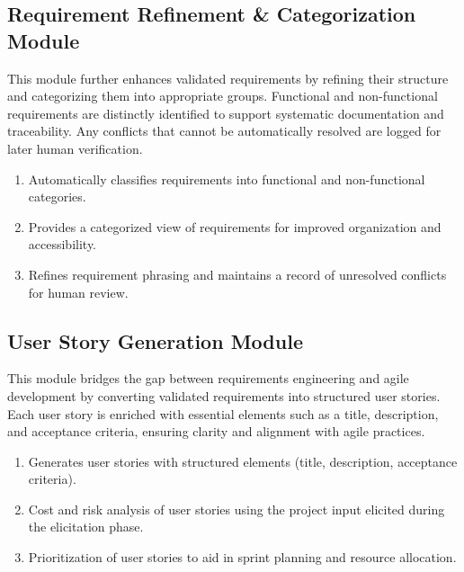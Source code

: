 \subsection{Requirement Refinement \& Categorization Module}
This module further enhances validated requirements by refining their structure and categorizing them into appropriate groups. Functional and non-functional requirements are distinctly identified to support systematic documentation and traceability. Any conflicts that cannot be automatically resolved are logged for later human verification.  
\begin{enumerate}
    \item Automatically classifies requirements into functional and non-functional categories.    
    \item Provides a categorized view of requirements for improved organization and accessibility.  
    \item Refines requirement phrasing and maintains a record of unresolved conflicts for human review.  
\end{enumerate}

\subsection{User Story Generation Module}
This module bridges the gap between requirements engineering and agile development by converting validated requirements into structured user stories. Each user story is enriched with essential elements such as a title, description, and acceptance criteria, ensuring clarity and alignment with agile practices.  
\begin{enumerate}
    \item Generates user stories with structured elements (title, description, acceptance criteria).  
    \item Cost and risk analysis of user stories using the project input elicited during the elicitation phase.
    \item Prioritization of user stories to aid in sprint planning and resource allocation.  
\end{enumerate}

